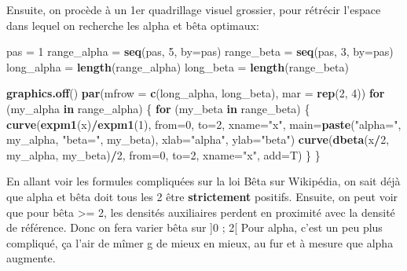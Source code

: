 \documentclass[]{article}
\newenvironment{Shaded}{\begin{snugshade}}{\end{snugshade}}
\newcommand{\ControlFlowTok}[1]{\textcolor[rgb]{0.13,0.29,0.53}{\textbf{#1}}}
\newcommand{\DataTypeTok}[1]{\textcolor[rgb]{0.13,0.29,0.53}{#1}}
\newcommand{\DecValTok}[1]{\textcolor[rgb]{0.00,0.00,0.81}{#1}}
\newcommand{\KeywordTok}[1]{\textcolor[rgb]{0.13,0.29,0.53}{\textbf{#1}}}
\newcommand{\NormalTok}[1]{#1}
\newcommand{\OperatorTok}[1]{\textcolor[rgb]{0.81,0.36,0.00}{\textbf{#1}}}
\newcommand{\StringTok}[1]{\textcolor[rgb]{0.31,0.60,0.02}{#1}}
\begin{document}
Ensuite, on procède à un 1er quadrillage visuel grossier, pour rétrécir
l'espace dans lequel on recherche les alpha et bêta optimaux:

\begin{Shaded}
\begin{Highlighting}[]
\NormalTok{pas =}\StringTok{ }\DecValTok{1}
\NormalTok{range_alpha =}\StringTok{ }\KeywordTok{seq}\NormalTok{(pas, }\DecValTok{5}\NormalTok{, }\DataTypeTok{by=}\NormalTok{pas)}
\NormalTok{range_beta =}\StringTok{ }\KeywordTok{seq}\NormalTok{(pas, }\DecValTok{3}\NormalTok{, }\DataTypeTok{by=}\NormalTok{pas)}
\NormalTok{long_alpha =}\StringTok{ }\KeywordTok{length}\NormalTok{(range_alpha)}
\NormalTok{long_beta =}\StringTok{ }\KeywordTok{length}\NormalTok{(range_beta)}

\KeywordTok{graphics.off}\NormalTok{()}
\KeywordTok{par}\NormalTok{(}\DataTypeTok{mfrow =} \KeywordTok{c}\NormalTok{(long_alpha, long_beta), }\DataTypeTok{mar =} \KeywordTok{rep}\NormalTok{(}\DecValTok{2}\NormalTok{, }\DecValTok{4}\NormalTok{))}
\ControlFlowTok{for}\NormalTok{ (my_alpha }\ControlFlowTok{in}\NormalTok{ range_alpha)}
\NormalTok{\{}
  \ControlFlowTok{for}\NormalTok{ (my_beta }\ControlFlowTok{in}\NormalTok{ range_beta)}
\NormalTok{  \{}
    \KeywordTok{curve}\NormalTok{(}\KeywordTok{expm1}\NormalTok{(x)}\OperatorTok{/}\KeywordTok{expm1}\NormalTok{(}\DecValTok{1}\NormalTok{), }\DataTypeTok{from=}\DecValTok{0}\NormalTok{, }\DataTypeTok{to=}\DecValTok{2}\NormalTok{, }\DataTypeTok{xname=}\StringTok{"x"}\NormalTok{, }
          \DataTypeTok{main=}\KeywordTok{paste}\NormalTok{(}\StringTok{"alpha="}\NormalTok{, my_alpha, }\StringTok{"beta="}\NormalTok{, my_beta),}
          \DataTypeTok{xlab=}\StringTok{"alpha"}\NormalTok{, }\DataTypeTok{ylab=}\StringTok{"beta"}\NormalTok{)}
    \KeywordTok{curve}\NormalTok{(}\KeywordTok{dbeta}\NormalTok{(x}\OperatorTok{/}\DecValTok{2}\NormalTok{, my_alpha, my_beta)}\OperatorTok{/}\DecValTok{2}\NormalTok{, }\DataTypeTok{from=}\DecValTok{0}\NormalTok{, }\DataTypeTok{to=}\DecValTok{2}\NormalTok{, }\DataTypeTok{xname=}\StringTok{"x"}\NormalTok{, }\DataTypeTok{add=}\NormalTok{T)}
\NormalTok{  \}}
\NormalTok{\}}
\end{Highlighting}
\end{Shaded}

En allant voir les formules compliquées sur la loi Bêta sur Wikipédia,
on sait déjà que alpha et bêta doit tous les 2 être \textbf{strictement}
positifs. Ensuite, on peut voir que pour bêta \textgreater{}= 2, les
densités auxiliaires perdent en proximité avec la densité de référence.
Donc on fera varier bêta sur {]}0 ; 2{[} Pour alpha, c'est un peu plus
compliqué, ça l'air de mîmer g de mieux en mieux, au fur et à mesure que
alpha augmente.
\end{document}
